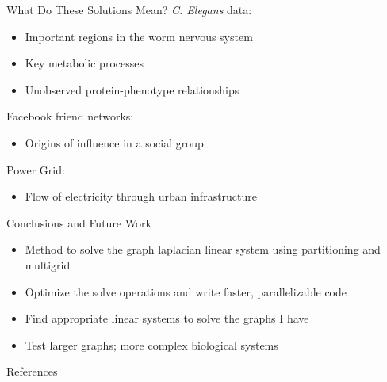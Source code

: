 \documentclass[xcolor=dvipsnames,10pt]{beamer}
\begin{document}
\begin{frame}{What Do These Solutions Mean?}
\large
\textit{C. Elegans} data:
\normalsize
\begin{itemize}
\item Important regions in the worm nervous system
\item Key metabolic processes
\item Unobserved protein-phenotype relationships
\end{itemize}
\vspace{.15in}
\large
Facebook friend networks:
\normalsize
\begin{itemize}
\item Origins of influence in a social group
\end{itemize}
\vspace{.15in}
\large
Power Grid:
\normalsize
\begin{itemize}
\item Flow of electricity through urban infrastructure
\end{itemize}
\end{frame}

\begin{frame}{Conclusions and Future Work}
\begin{itemize}
\item Method to solve the graph laplacian linear system using partitioning and multigrid
\vspace{.15in}
\item Optimize the solve operations and write faster, parallelizable code

\vspace{.15in}
\item Find appropriate linear systems to solve the graphs I have

\vspace{.15in}
\item Test larger graphs; more complex biological systems
\end{itemize}
\end{frame}



\begin{frame}{References}
\tiny


\end{frame}
\end{document}
